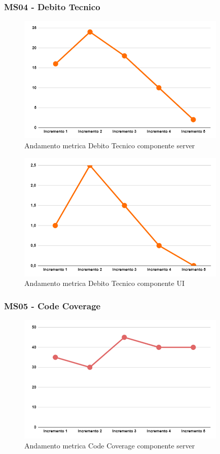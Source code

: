 \subsubsection{MS04 - Debito Tecnico}
\begin{figure}[H]
	\centering
	\includegraphics[width=10cm]{images/metricheServer/debito_tecnico.png}
	\caption{Andamento metrica Debito Tecnico componente server}
\end{figure}
\begin{figure}[H]
	\centering
	\includegraphics[width=10cm]{images/metricheUI/debito_tecnico.png}
	\caption{Andamento metrica Debito Tecnico componente UI}
\end{figure}

\subsubsection{MS05 - Code Coverage}
\begin{figure}[H]
	\centering
	\includegraphics[width=10cm]{images/metricheServer/code_coverage.png}
	\caption{Andamento metrica Code Coverage componente server}
\end{figure}

